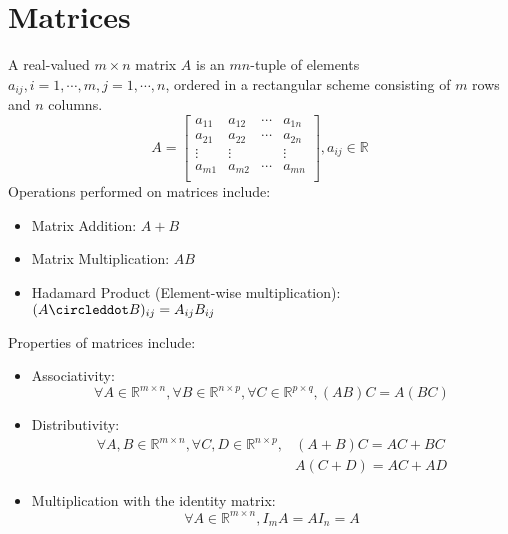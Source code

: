 \section{Matrices}
\begin{definition}[Matrix]
    A real-valued $m\times n$ matrix $A$ is an $mn$-tuple of elements
    $a_{ij}, i=1,\cdots, m, j=1, \cdots, n$,
    ordered in a rectangular scheme consisting of $m$ rows and $n$ columns.
    \[
        A = \begin{bmatrix}
            a_{11} & a_{12} & \cdots & a_{1n} \\
            a_{21} & a_{22} & \cdots & a_{2n} \\
            \vdots & \vdots &  & \vdots \\
            a_{m1} & a_{m2} & \cdots & a_{mn} \\
        \end{bmatrix}, a_{ij}\in\mathbb{R}
    \]
    Operations performed on matrices include:
    \begin{itemize}
        \item{Matrix Addition: $A + B$}
        \item{Matrix Multiplication: $AB$}
        \item{Hadamard Product (Element-wise multiplication): $(A\circleddot B)_{ij} = A_{ij}B_{ij}$}
    \end{itemize}
    Properties of matrices include:
    \begin{itemize}
        \item{Associativity:
                \[
                    \forall A\in\mathbb{R}^{m\times n},
                    \forall B\in\mathbb{R}^{n\times p},
                    \forall C\in\mathbb{R}^{p\times q}, 
                    (AB)C=A(BC)
                \]
            }
        \item{Distributivity:
                \[
                    \begin{split}
                        \forall A, B\in\mathbb{R}^{m\times n},
                        \forall C, D\in\mathbb{R}^{n\times p}, & (A + B)C = AC + BC \\
                                                               & A(C + D) = AC + AD
                    \end{split}
                \]
            }
        \item{Multiplication with the identity matrix:
                \[
                    \forall A\in\mathbb{R}^{m\times n}, I_m A = AI_n = A 
                \]
            }
    \end{itemize}
\end{definition}

